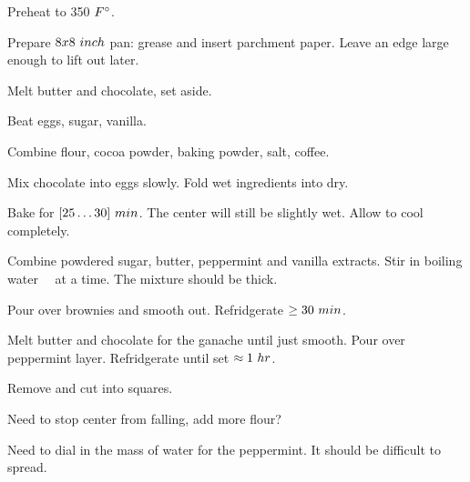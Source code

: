 \begin{preparation}
\item Preheat to 350 $\Fahrenheit$.

\item Prepare $8x8~\inch$ pan: grease and insert parchment paper.
	Leave an edge large enough to lift out later.

\item Melt butter and chocolate, set aside.

\item Beat eggs, sugar, vanilla.

\item Combine flour, cocoa powder, baking powder, salt, coffee.

\item Mix chocolate into eggs slowly.
	Fold wet ingredients into dry.

\item Bake for $[25 \ldots 30]~\minute$.
	The center will still be slightly wet.
	Allow to cool completely.

\item Combine powdered sugar, butter, peppermint and vanilla extracts.
	Stir in boiling water \onehalf~\teaspoon~at a time.
	The mixture should be thick.

\item Pour over brownies and smooth out.
	Refridgerate $\ge 30~\minute$.

\item Melt butter and chocolate for the ganache until just smooth.
	Pour over peppermint layer.
	Refridgerate until set $\approx 1~\hour$.

\item Remove and cut into squares.
\end{preparation}


\begin{experiments}
\item Need to stop center from falling, add more flour?
\item Need to dial in the mass of water for the peppermint.
	It should be difficult to spread.
\end{experiments}


\recipeend
